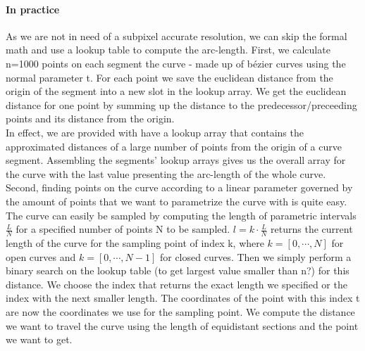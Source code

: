 \paragraph{In practice}
As we are not in need of a subpixel accurate resolution, we can skip the formal math and use a lookup table to compute the arc-length.
First, we calculate n=1000 points on each segment the curve - made up of b\'{e}zier curves using the normal parameter t. For each point we save the euclidean distance from the origin of the segment into a new slot in the lookup array. We get the euclidean distance for one point by summing up the distance to the predecessor/preceeding points and its distance from the origin.\\
In effect, we are provided with have a lookup array that contains the approximated distances of a large number of points from the origin of a curve segment. Assembling the segments' lookup arrays gives us the overall array for the curve with the last value presenting the arc-length of the whole curve.\\ 
Second, finding points on the curve according to a linear parameter governed by the amount of points that we want to parametrize the curve with is quite easy. The curve can easily be sampled by computing the length of parametric intervals $\frac{L}{N}$ for a specified number of points N to be sampled. $l=k \cdot \frac{L}{N}$ returns the current length of the curve for the sampling point of index k, where $k=[0,\cdots,N]$ for open curves and $k=[0,\cdots,N-1]$ for closed curves.
Then we simply perform a binary search on the lookup table (to get largest value smaller than n?) for this distance. We choose the index that returns the exact length we specified or the index with the next smaller length. The coordinates of the point with this index t are now the coordinates we use for the sampling point.
We compute the distance we want to travel the curve using the length of equidistant sections and the point we want to get.
